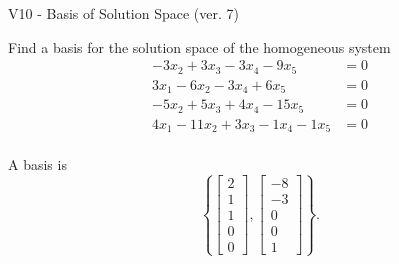\begin{exercise}
  \begin{exerciseTitle}V10 - Basis of Solution Space (ver. 7)\end{exerciseTitle}
  \begin{exerciseStatement}
    Find a basis for the solution space of the homogeneous system 
\begin{align*}
 -3 x_ 2 + 3 x_ 3 -3 x_ 4 -9 x_ 5 &= 0  \\ 
  3 x_ 1 -6 x_ 2 -3 x_ 4 + 6 x_ 5 &= 0  \\ 
  -5 x_ 2 + 5 x_ 3 + 4 x_ 4 -15 x_ 5 &= 0  \\ 
  4 x_ 1 -11 x_ 2 + 3 x_ 3 -1 x_ 4 -1 x_ 5 &= 0  \\ 
 \end{align*}


 
  \end{exerciseStatement}

  \begin{exerciseAnswer}
   A basis is   
\[\left\{\left[\begin{array}{c}
2 \\
1 \\
1 \\
0 \\
0
\end{array}\right] , \left[\begin{array}{c}
-8 \\
-3 \\
0 \\
0 \\
1
\end{array}\right]\right\}.\]

  


  \end{exerciseAnswer}
\end{exercise}